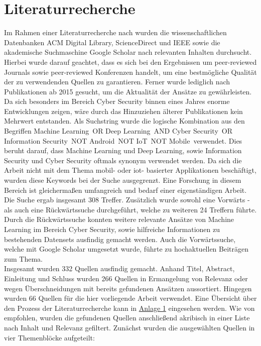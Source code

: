 \documentclass[
    12pt, %
    DIV10,
    ngerman, %
    a4paper, %
    oneside, %
    titlepage, %
    parskip=half, %
    headings=normal, %
    listof=totoc, %
    bibliography=totoc, %
    index=totoc, %
    captions=tableheading, %
    final %
]{scrreprt}
\begin{document}
\section{Literaturrecherche}
\label{sec:lr}
Im Rahmen einer Literaturrecherche nach \textcite{Webster2002} wurden die wissenschaftlichen Datenbanken ACM Digital Library, ScienceDirect und IEEE sowie die akademische Suchmaschine Google Scholar nach relevanten Inhalten durchsucht. Hierbei wurde darauf geachtet, dass es sich bei den Ergebnissen um peer-reviewed Journals sowie peer-reviewed Konferenzen handelt, um eine bestmögliche Qualität der zu verwendenden Quellen zu garantieren. Ferner wurde lediglich nach Publikationen ab 2015 gesucht, um die Aktualität der Ansätze zu gewährleisten. Da sich besonders im Bereich Cyber Security binnen eines Jahres enorme Entwicklungen zeigen, wäre durch das Hinzuziehen älterer Publikationen kein Mehrwert entstanden. Als Suchstring wurde die logische Kombination aus den Begriffen \glqq Machine Learning\grqq\ OR \glqq Deep Learning\grqq\ AND \glqq Cyber Security\grqq\ OR \glqq Information Security\grqq\ NOT \glqq Android\grqq\ NOT \glqq IoT\grqq\ NOT \glqq Mobile\grqq\ verwendet. Dies beruht darauf, dass Machine Learning und Deep Learning, sowie Information Security und Cyber Security oftmals synonym verwendet werden. Da sich die Arbeit nicht mit dem Thema mobil- oder \ac{iot}- basierter Applikationen beschäftigt, wurden diese Keywords bei der Suche ausgegrenzt. Eine Forschung in diesem Bereich ist gleicherma{\ss}en umfangreich und bedarf einer eigenständigen Arbeit.\\
Die Suche ergab insgesamt 308 Treffer. Zusätzlich wurde sowohl eine Vorwärts - als auch eine Rückwärtssuche durchgeführt, welche zu weiteren 24 Treffern führte. Durch die Rückwärtssuche konnten weitere relevante Ansätze von Machine Learning im Bereich Cyber Security, sowie hilfreiche Informationen zu bestehenden Datensets ausfindig gemacht werden. Auch die Vorwärtssuche, welche mit Google Scholar umgesetzt wurde, führte zu hochaktuellen Beiträgen zum Thema.\\
Insgesamt wurden 332 Quellen ausfindig gemacht. Anhand Titel, Abstract, Einleitung und Schluss wurden 266 Quellen in Ermangelung von Relevanz oder wegen Überschneidungen mit bereits gefundenen Ansätzen aussortiert. Hingegen wurden 66 Quellen für die hier vorliegende Arbeit verwendet. Eine Übersicht über den Prozess der Literaturrecherche kann in \hyperref[rm]{Anlage 1} eingesehen werden. Wie von \textcite{Webster2002} empfohlen, wurden die gefundenen Quellen anschlie{\ss}end akribisch in einer Liste nach Inhalt und Relevanz gefiltert. Zunächst wurden die ausgewählten Quellen in vier Themenblöcke aufgeteilt:
\end{document}

